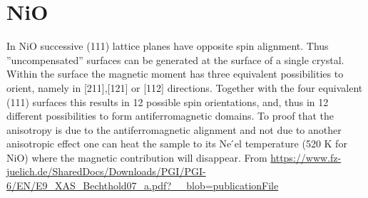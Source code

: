 \section{NiO}
In NiO successive (111) lattice planes have opposite spin alignment. Thus ”uncompensated”
surfaces can be generated at the surface of a single crystal. Within the surface the magnetic
moment has three equivalent possibilities to orient, namely in [211],[121] or [112] directions.
Together with the four equivalent (111) surfaces this results in 12 possible spin orientations, and,
thus in 12 different possibilities to form antiferromagnetic domains. To proof that the anisotropy
is due to the antiferromagnetic alignment and not due to another anisotropic effect one can
heat the sample to its Ne ́el temperature (520 K for NiO) where the magnetic contribution will
disappear. From \url{https://www.fz-juelich.de/SharedDocs/Downloads/PGI/PGI-6/EN/E9_XAS_Bechthold07_a.pdf?__blob=publicationFile}

\section{}